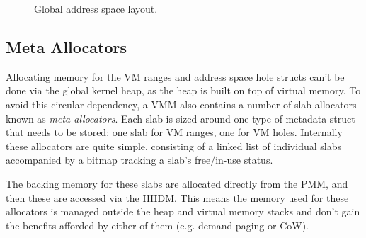 \begin{figure}[h]
\centering
{}
\caption{Global address space layout.}
\end{figure}

\subsection{Meta Allocators}
Allocating memory for the VM ranges and address space hole structs can't be done via the global kernel heap, as the heap is built on top of virtual memory. To avoid this circular dependency, a VMM also contains a number of slab allocators known as \textit{meta allocators}. Each slab is sized around one type of metadata struct that needs to be stored: one slab for VM ranges, one for VM holes. Internally these allocators are quite simple, consisting of a linked list of individual slabs accompanied by a bitmap tracking a slab's free/in-use status.

The backing memory for these slabs are allocated directly from the PMM, and then these are accessed via the HHDM. This means the memory used for these allocators is managed outside the heap and virtual memory stacks and don't gain the benefits afforded by either of them (e.g. demand paging or CoW).

